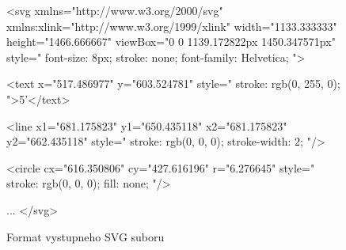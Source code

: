 \begin{figure}
\begin{code}[fontsize=\scriptsize, frame=none, samepage=true]
<svg
  xmlns="http://www.w3.org/2000/svg"
  xmlns:xlink="http://www.w3.org/1999/xlink"
  width="1133.333333"
  height="1466.666667"
  viewBox="0 0 1139.172822px 1450.347571px"
  style="
    font-size: 8px; 
    stroke: none; 
    font-family: Helvetica; ">

  <text 
    x="517.486977"
    y="603.524781"
    style="
      stroke: rgb(0, 255, 0); ">5'</text>

  <line 
    x1="681.175823"
    y1="650.435118" 
    x2="681.175823"
    y2="662.435118"
    style="
      stroke: rgb(0, 0, 0); 
      stroke-width: 2; "/>


  <circle 
    cx="616.350806"
    cy="427.616196"
    r="6.276645"
    style="
      stroke: rgb(0, 0, 0); 
      fill: none; "/>

  ...
</svg>
\end{code}
\caption{Format vystupneho SVG suboru}
\label{obr:svg_out}
\end{figure}



